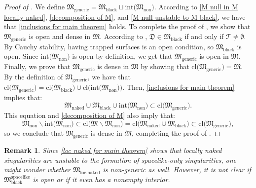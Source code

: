 \documentclass[11pt]{article}
\newtheorem{remark}{Remark}[section]
\numberwithin{equation}{section}
\begin{document}
\begin{proof}[Proof of ]
    We define $\mathfrak{M}_{\mathrm{generic}}=\mathfrak{M}_{\mathrm{black}}\sqcup\mathrm{int}\big(\mathfrak{M}_{\mathrm{non}}\big).$ According to \eqref{M null in M locally naked}, \eqref{decomposition of M}, and \eqref{M null unstable to M black}, we have that \eqref{inclusions for main theorem} holds. To complete the proof of , we show that $\mathfrak{M}_{\mathrm{generic}}$ is open and dense in $\mathfrak{M}$. According to , $\mathfrak{D}\in\mathfrak{M}_{\mathrm{black}}$ if and only if $\mathcal{T}\neq\emptyset.$ By Cauchy stability, having trapped surfaces is an open condition, so $\mathfrak{M}_{\mathrm{black}}$ is open. Since $\mathrm{int}\big(\mathfrak{M}_{\mathrm{non}}\big)$ is open by definition, we get that $\mathfrak{M}_{\mathrm{generic}}$ is open in $\mathfrak{M}.$ Finally, we prove that $\mathfrak{M}_{\mathrm{generic}}$ is dense in $\mathfrak{M}$ by showing that $\mathrm{cl}\big(\mathfrak{M}_{\mathrm{generic}}\big)=\mathfrak{M}.$ By the definition of $\mathfrak{M}_{\mathrm{generic}}$, we have that $\mathrm{cl}\big(\mathfrak{M}_{\mathrm{generic}}\big)=\mathrm{cl}\big(\mathfrak{M}_{\mathrm{black}}\big)\cup\mathrm{cl}\big(\mathrm{int}\big(\mathfrak{M}_{\mathrm{non}}\big)\big).$ Then, \eqref{inclusions for main theorem} implies that:
    \[\mathfrak{M}_{\mathrm{naked}}\cup\mathfrak{M}_{\mathrm{black}}\cup\mathrm{int}\big(\mathfrak{M}_{\mathrm{non}}\big)\subset\mathrm{cl}\big(\mathfrak{M}_{\mathrm{generic}}\big).\]
    This equation and \eqref{decomposition of M} also imply that: \[\mathfrak{M}_{\mathrm{non}}\backslash\mathrm{int}\big(\mathfrak{M}_{\mathrm{non}}\big)\subset\mathrm{cl}\big(\mathfrak{M}\backslash\mathfrak{M}_{\mathrm{non}}\big)=\mathrm{cl}\big(\mathfrak{M}_{\mathrm{naked}}\cup\mathfrak{M}_{\mathrm{black}}\big)\subset\mathrm{cl}\big(\mathfrak{M}_{\mathrm{generic}}\big),\]
    so we conclude that $\mathfrak{M}_{\mathrm{generic}}$ is dense in $\mathfrak{M}$, completing the proof of .
\end{proof}

\begin{remark}
    Since \eqref{loc naked for main theorem} shows that locally naked singularities are unstable to the formation of spacelike-only singularities, one might wonder whether $\mathfrak{M}_{\mathrm{loc.naked}}$ is non-generic as well. However, it is not clear if $\mathfrak{M}_{\mathrm{black}}^{\mathrm{spacelike}}$ is open or if it even has a nonempty interior.
\end{remark}
\end{document}
